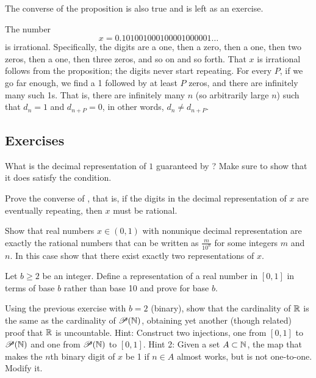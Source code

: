 The converse of the proposition is also true and is left as an exercise.

\begin{example}
The number
\begin{equation*}
x = 0.101001000100001000001\ldots
\end{equation*}
is irrational.
Specifically, the digits are a one,
then a zero, then a one, then two zeros, then a one,
then three zeros,
and so on and so forth.
That $x$ is irrational follows from the
proposition; the digits never start repeating.
For every $P$,
if we go far enough, we find a 1 followed by at least $P$ zeros,
and there are infinitely many such 1s.
That is, there are infinitely many $n$ (so arbitrarily large $n$)
such that $d_n=1$ and $d_{n+P}=0$, in other words,
$d_n \neq d_{n+P}$.
\end{example}

\subsection{Exercises}

\begin{exercise}[Easy]
What is the decimal representation of $1$ guaranteed by
?  Make sure to show that it does satisfy
the condition.
\end{exercise}

\begin{exercise}
Prove the converse of , that is,
if the digits in the decimal representation of $x$ are eventually repeating, then
$x$ must be rational.
\end{exercise}

\begin{exercise} \label{exercise:nonuniquedecimals}
Show that real numbers $x \in (0,1)$ with nonunique decimal representation
are exactly the rational numbers that can be written
as $\frac{m}{10^n}$ for some integers $m$ and $n$.  In this case show that
there exist exactly two representations of $x$.
\end{exercise}

\begin{exercise} \label{exercise:decimalpropbaseb}
Let $b \geq 2$ be an integer.  Define a representation of a real number in
$[0,1]$ in terms of base $b$ rather than base 10 and prove
 for base $b$.
\end{exercise}

\begin{exercise}
Using the previous exercise with $b=2$ (binary),
show that the cardinality of ${\mathbb{R}}$ is the same as the cardinality of ${\mathscr{P}}({\mathbb{N}})$,
obtaining yet another (though related) proof that ${\mathbb{R}}$ is uncountable.
Hint: Construct two injections, one from $[0,1]$ to ${\mathscr{P}}({\mathbb{N}})$
and one from ${\mathscr{P}}({\mathbb{N}})$ to $[0,1]$.  Hint 2: Given a
set $A \subset {\mathbb{N}}$, the map that makes the $n$th binary digit of $x$ be 1 if
$n\in A$ almost works, but is not one-to-one.  Modify it.
\end{exercise}

